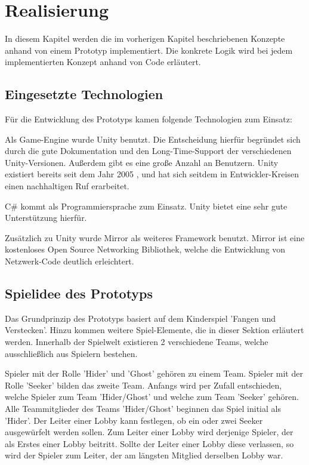 \chapter{Realisierung}
\label{sec:realisierung}

In diesem Kapitel werden die im vorherigen Kapitel beschriebenen Konzepte anhand von einem Prototyp implementiert. Die konkrete Logik wird bei jedem implementierten Konzept anhand von Code erläutert.

\section{Eingesetzte Technologien}

Für die Entwicklung des Prototyps kamen folgende Technologien zum Einsatz:

Als Game-Engine wurde Unity \cite{Technologies.03.02.2022} benutzt. Die Entscheidung hierfür begründet sich durch die gute Dokumentation und den Long-Time-Support der verschiedenen Unity-Versionen. Außerdem gibt es eine große Anzahl an Benutzern. Unity existiert bereits seit dem Jahr 2005 \cite{Wikipedia.2022c}, und hat sich seitdem in Entwickler-Kreisen einen nachhaltigen Ruf erarbeitet.

C\# kommt als Programmiersprache zum Einsatz. Unity bietet eine sehr gute Unterstützung hierfür.

Zusätzlich zu Unity wurde Mirror\cite{.03.02.2022} als weiteres Framework benutzt. Mirror ist eine kostenloses Open Source Networking Bibliothek, welche die Entwicklung von Netzwerk-Code deutlich erleichtert.

\section{Spielidee des Prototyps}
\label{Spielidee}

Das Grundprinzip des Prototyps basiert auf dem Kinderspiel 'Fangen und Verstecken'. Hinzu kommen weitere Spiel-Elemente, die in dieser Sektion erläutert werden. Innerhalb der Spielwelt existieren 2 verschiedene Teams, welche ausschließlich aus Spielern bestehen.

Spieler mit der Rolle 'Hider' und 'Ghost' gehören zu einem Team.  Spieler mit der Rolle 'Seeker' bilden das zweite Team. Anfangs wird per Zufall entschieden, welche Spieler zum Team 'Hider/Ghost' und welche zum Team 'Seeker' gehören. Alle Teammitglieder des Teams 'Hider/Ghost' beginnen das Spiel initial als 'Hider'. Der Leiter einer Lobby kann festlegen, ob ein oder zwei Seeker ausgewürfelt werden sollen. Zum Leiter einer Lobby wird derjenige Spieler, der als Erstes einer Lobby beitritt. Sollte der Leiter einer Lobby diese verlassen, so wird der Spieler zum Leiter, der am längsten Mitglied derselben Lobby war.

